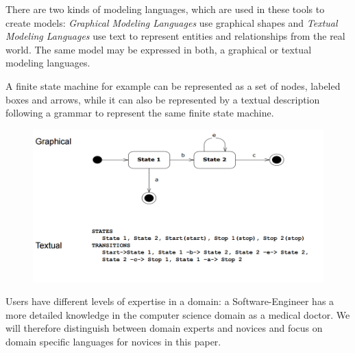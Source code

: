 \documentclass[runningheads,a4paper]{llncs}
\begin{document}
 There are two kinds of modeling languages, which are used in these tools to create models:
 \emph{Graphical Modeling Languages} use graphical shapes and
 \emph{Textual Modeling Languages} use text to represent entities and relationships from the real world.
 The same model may be expressed in both, a graphical or textual modeling languages.
 
 A finite state machine for example can be represented as a set of nodes, labeled boxes and arrows, while it can also be 
 represented by a textual description following a grammar to represent the same finite state machine.
 
  \begin{figure}[H]
      \centering
      \includegraphics[width=\textwidth]{images/GraficalTextualComparison.PNG}
      \label{compare:textgraphiclang}
    \end{figure}

 Users have different levels of expertise in a domain: a Software-Engineer has a more detailed knowledge in the computer science domain as a medical doctor.
 We will therefore distinguish between domain experts and novices and focus on domain specific languages for novices in this paper.
 
%  
 
\end{document}
